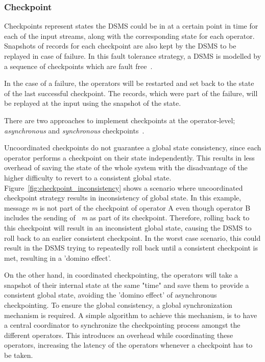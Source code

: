 

\subsubsection{Checkpoint}

Checkpoints represent states the DSMS could be in at a certain point in 
time for each of the input streams, along with the corresponding 
state for each operator. Snapshots of records for each checkpoint are also kept 
by the DSMS to be replayed in case of failure. 
In this fault tolerance strategy, a DSMS is modelled by a sequence of 
checkpoints which are fault free~\cite{fault_tolerance_dsms}. 

In the case of a failure, the operators will be restarted and set back to the state of the 
last successful checkpoint. The records, which were part of the failure, will be replayed
at the input using the snapshot of the state. 

There are two approaches to implement checkpoints at the operator-level; 
\emph{asynchronous} and \emph{synchronous} checkpoints~\cite{fault_tolerance_dsms}.

Uncoordinated checkpoints do not guarantee a global state consistency, since 
each operator performs a checkpoint on their state independently. This results 
in less overhead of saving the state of the whole system with the disadvantage of the higher 
difficulty to revert to a consistent global state.
Figure~\ref{fig:checkpoint_inconsistency}
shows a scenario where uncoordinated checkpoint strategy results in inconsistency of 
global state. In this example, message \emph{m} is not part of the checkpoint of operator 
A even though operator B includes the sending of ~\emph{m} as part of its checkpoint. Therefore, 
rolling back to this checkpoint will result in an inconsistent global state, causing the 
DSMS to roll back to an earlier consistent checkpoint. In the worst case scenario, this could result 
in the DSMS trying to repeatedly roll back until a consistent checkpoint is met, 
resulting in a 'domino effect'.  

On the other hand, in coordinated checkpointing, the operators will take a snapshot 
of their internal state at the same "time" and save them to provide a consistent 
global state, avoiding the 'domino effect' of asynchronous checkpointing. To ensure 
the global consistency, a global synchronization mechanism is required. A simple 
algorithm to achieve this mechanism, is to have a central coordinator to synchronize 
the checkpointing process amongst the different operators. This introduces an overhead 
while coordinating these operators, increasing the latency of the operators whenever a 
checkpoint has to be taken. 


